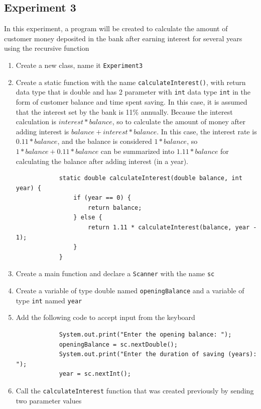 \documentclass[12pt,titlepage]{article}
\begin{document}
\subsection{Experiment 3}
In this experiment, a program will be created to calculate the amount of customer money deposited in the bank after earning interest 
for several years using the recursive function
\begin{enumerate}
    \item Create a new class, name it \texttt{Experiment3}
    \item {
        Create a static function with the name \texttt{calculateInterest()}, with return data type
        that is double and has 2 parameter with \texttt{int} data type \texttt{int} in the form of customer
        balance and time spent saving. In this case, it is assumed that the interest set by the bank is 11\% annually. 
        Because the interest calculation is $interest * balance$, so to calculate the amount
        of money after adding interest is $balance + interest * balance$. In this case, the
        interest rate is $0.11 * balance$, and the balance is considered $1 * balance$, so $1 *
        balance + 0.11 * balance$ can be summarized into $1.11 * balance$ for calculating
        the balance after adding interest (in a year).

        \begin{verbatim}
            static double calculateInterest(double balance, int year) {
                if (year == 0) {
                    return balance;
                } else {
                    return 1.11 * calculateInterest(balance, year - 1);
                }
            }
        \end{verbatim}
    }
    \item Create a main function and declare a \texttt{Scanner} with the name \texttt{sc}
    \item Create a variable of type double named \texttt{openingBalance} and a variable of type \texttt{int} named \texttt{year}
    \item {
        Add the following code to accept input from the keyboard

        \begin{verbatim}
            System.out.print("Enter the opening balance: ");
            openingBalance = sc.nextDouble();
            System.out.print("Enter the duration of saving (years): ");
            year = sc.nextInt();
        \end{verbatim}
    }
    \item {
        Call the \texttt{calculateInterest} function that was created previously by sending two parameter values

}
\end{enumerate}
\end{document}
